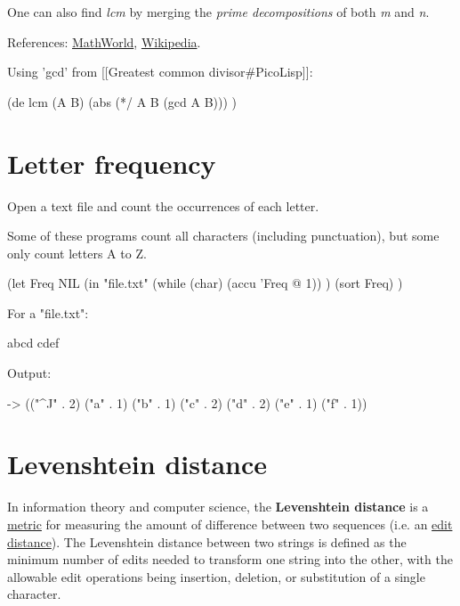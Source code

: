 One can also find \emph{lcm} by merging the
\emph{prime decompositions} of both \emph{m}
and \emph{n}.

References:
\href{http://mathworld.wolfram.com/LeastCommonMultiple.html}{MathWorld},
\href{http://en.wikipedia.org/wiki/Least\_common\_multiple}{Wikipedia}.

\begin{wideverbatim}

Using 'gcd' from [[Greatest common divisor#PicoLisp]]:

(de lcm (A B)
   (abs (*/ A B (gcd A B))) )

\end{wideverbatim}

\pagebreak{}
\section*{Letter frequency}

Open a text file and count the occurrences of each letter.

Some of these programs count all characters (including punctuation), but
some only count letters A to Z.


\begin{wideverbatim}

(let Freq NIL
   (in "file.txt"
      (while (char) (accu 'Freq @ 1)) )
   (sort Freq) )

For a "file.txt":

abcd
cdef

Output:

-> (("^J" . 2) ("a" . 1) ("b" . 1) ("c" . 2) ("d" . 2) ("e" . 1) ("f" . 1))

\end{wideverbatim}

\pagebreak{}
\section*{Levenshtein distance}

In information theory and computer science, the \textbf{Levenshtein
distance} is a
\href{http://en.wikipedia.org/wiki/string\_metric}{metric} for measuring
the amount of difference between two sequences (i.e. an
\href{http://en.wikipedia.org/wiki/edit\_distance}{edit distance}). The
Levenshtein distance between two strings is defined as the minimum
number of edits needed to transform one string into the other, with the
allowable edit operations being insertion, deletion, or substitution of
a single character.

